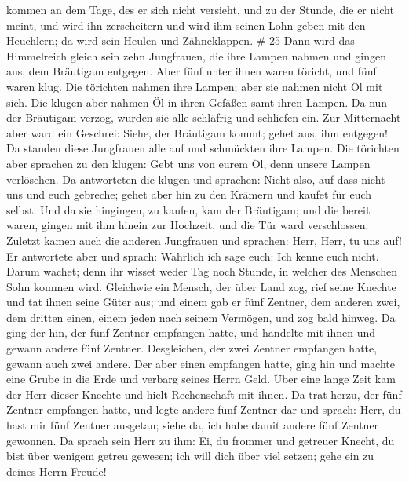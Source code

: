 kommen an dem Tage, des er sich nicht versieht, und zu der Stunde, die
er nicht meint,  und wird ihn zerscheitern und wird ihm
seinen Lohn geben mit den Heuchlern; da wird sein Heulen und
Zähneklappen. \# 25  Dann wird das Himmelreich gleich sein
zehn Jungfrauen, die ihre Lampen nahmen und gingen aus, dem Bräutigam
entgegen.  Aber fünf unter ihnen waren töricht, und fünf
waren klug.  Die törichten nahmen ihre Lampen; aber sie
nahmen nicht Öl mit sich.  Die klugen aber nahmen Öl in
ihren Gefäßen samt ihren Lampen.  Da nun der Bräutigam
verzog, wurden sie alle schläfrig und schliefen ein.  Zur
Mitternacht aber ward ein Geschrei: Siehe, der Bräutigam kommt; gehet
aus, ihm entgegen!  Da standen diese Jungfrauen alle auf und
schmückten ihre Lampen.  Die törichten aber sprachen zu den
klugen: Gebt uns von eurem Öl, denn unsere Lampen verlöschen.
 Da antworteten die klugen und sprachen: Nicht also, auf
dass nicht uns und euch gebreche; gehet aber hin zu den Krämern und
kaufet für euch selbst.  Und da sie hingingen, zu kaufen,
kam der Bräutigam; und die bereit waren, gingen mit ihm hinein zur
Hochzeit, und die Tür ward verschlossen.  Zuletzt kamen
auch die anderen Jungfrauen und sprachen: Herr, Herr, tu uns auf!
 Er antwortete aber und sprach: Wahrlich ich sage euch: Ich
kenne euch nicht.  Darum wachet; denn ihr wisset weder Tag
noch Stunde, in welcher des Menschen Sohn kommen wird. 
Gleichwie ein Mensch, der über Land zog, rief seine Knechte und tat
ihnen seine Güter aus;  und einem gab er fünf Zentner, dem
anderen zwei, dem dritten einen, einem jeden nach seinem Vermögen, und
zog bald hinweg.  Da ging der hin, der fünf Zentner
empfangen hatte, und handelte mit ihnen und gewann andere fünf Zentner.
 Desgleichen, der zwei Zentner empfangen hatte, gewann auch
zwei andere.  Der aber einen empfangen hatte, ging hin und
machte eine Grube in die Erde und verbarg seines Herrn Geld.
 Über eine lange Zeit kam der Herr dieser Knechte und hielt
Rechenschaft mit ihnen.  Da trat herzu, der fünf Zentner
empfangen hatte, und legte andere fünf Zentner dar und sprach: Herr, du
hast mir fünf Zentner ausgetan; siehe da, ich habe damit andere fünf
Zentner gewonnen.  Da sprach sein Herr zu ihm: Ei, du
frommer und getreuer Knecht, du bist über wenigem getreu gewesen; ich
will dich über viel setzen; gehe ein zu deines Herrn Freude!
